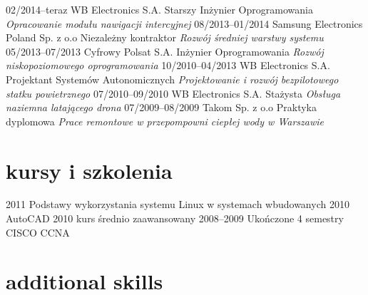 \documentclass[]{friggeri-cv}
\begin{document}
\begin{entrylist}
  \entry
    {02/2014–teraz}
    {WB Electronics S.A.}
    {Starszy Inżynier Oprogramowania}
    {\emph{Opracowanie modułu nawigacji intercyjnej}}
  \entry
    {08/2013–01/2014}
    {Samsung Electronics Poland Sp. z o.o}
    {Niezależny kontraktor}
    {\emph{Rozwój średniej warstwy systemu}}
  \entry
    {05/2013–07/2013}
    {Cyfrowy Polsat S.A.}
    {Inżynier Oprogramowania}
    {\emph{Rozwój niskopoziomowego oprogramowania}}
  \entry
    {10/2010–04/2013}
    {WB Electronics S.A.}
    {Projektant Systemów Autonomicznych}
    {\emph{Projektowanie i rozwój bezpilotowego statku powietrznego}}
  \entry
    {07/2010–09/2010}
    {WB Electronics S.A.}
    {Stażysta}
    {\emph{Obsługa naziemna latającego drona}}
  \entry
    {07/2009–08/2009}
    {Takom Sp. z o.o}
    {Praktyka dyplomowa}
    {\emph{Prace remontowe w przepompowni ciepłej wody w Warszawie}}
\end{entrylist}

\section{kursy i szkolenia}

\begin{entrylist}
  \entry
    {2011}
    {Podstawy wykorzystania systemu Linux w systemach wbudowanych}
    {}
    {}
  \entry
    {2010}
    {AutoCAD 2010 kurs średnio zaawansowany}
    {}
    {}
  \entry
    {2008–2009}
    {Ukończone 4 semestry CISCO CCNA}
    {}
    {}
\end{entrylist}

\section{additional skills}
\end{document}
